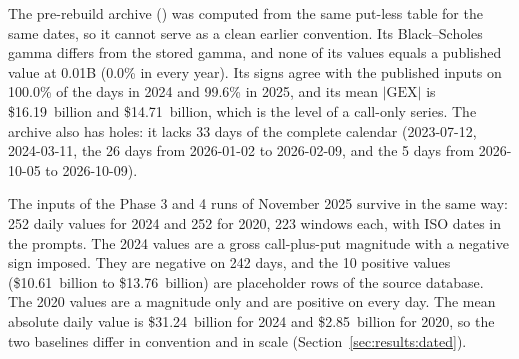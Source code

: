 The pre-rebuild archive () was computed from the same put-less table for the same dates, so it cannot serve as a clean earlier convention. Its Black--Scholes gamma differs from the stored gamma, and none of its values equals a published value at 0.01B (0.0\% in every year). Its signs agree with the published inputs on 100.0\% of the days in 2024 and 99.6\% in 2025, and its mean $|\mathrm{GEX}|$ is \$16.19~billion and \$14.71~billion, which is the level of a call-only series. The archive also has holes: it lacks 33 days of the complete calendar (2023-07-12, 2024-03-11, the 26 days from 2026-01-02 to 2026-02-09, and the 5 days from 2026-10-05 to 2026-10-09).

The inputs of the Phase 3 and 4 runs of November 2025 survive in the same way: 252 daily values for 2024 and 252 for 2020, 223 windows each, with ISO dates in the prompts. The 2024 values are a gross call-plus-put magnitude with a negative sign imposed. They are negative on 242 days, and the 10 positive values (\$10.61~billion to \$13.76~billion) are placeholder rows of the source database. The 2020 values are a magnitude only and are positive on every day. The mean absolute daily value is \$31.24~billion for 2024 and \$2.85~billion for 2020, so the two baselines differ in convention and in scale (Section~\ref{sec:results:dated}).

